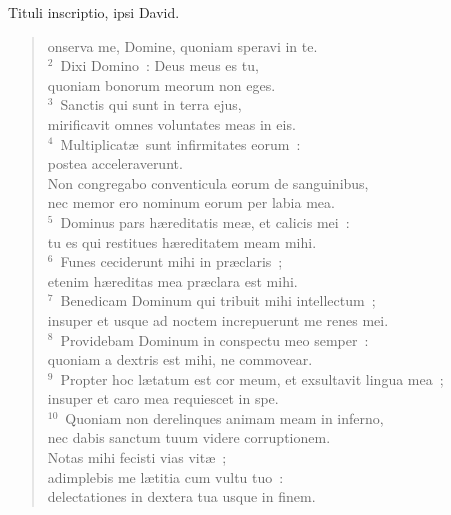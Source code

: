 \bchapter[Psalm]
Tituli inscriptio, ipsi David. \begin{verse}onserva me, Domine, quoniam speravi in te.\\
${}^{2}$~Dixi Domino~: Deus meus es tu,\\ quoniam bonorum meorum non eges.\\
${}^{3}$~Sanctis qui sunt in terra ejus,\\ mirificavit omnes voluntates meas in eis.\\
${}^{4}$~Multiplicat\ae\ sunt infirmitates eorum~:\\ postea acceleraverunt.\\ Non congregabo conventicula eorum de sanguinibus,\\ nec memor ero nominum eorum per labia mea.\\
${}^{5}$~Dominus pars h\ae reditatis me\ae , et calicis mei~:\\ tu es qui restitues h\ae reditatem meam mihi.\\
${}^{6}$~Funes ceciderunt mihi in pr\ae claris~;\\ etenim h\ae reditas mea pr\ae clara est mihi.\\
${}^{7}$~Benedicam Dominum qui tribuit mihi intellectum~;\\ insuper et usque ad noctem increpuerunt me renes mei.\\
${}^{8}$~Providebam Dominum in conspectu meo semper~:\\ quoniam a dextris est mihi, ne commovear.\\
${}^{9}$~Propter hoc l\ae tatum est cor meum, et exsultavit lingua mea~;\\ insuper et caro mea requiescet in spe.\\
${}^{10}$~Quoniam non derelinques animam meam in inferno,\\ nec dabis sanctum tuum videre corruptionem.\\ Notas mihi fecisti vias vit\ae~;\\ adimplebis me l\ae titia cum vultu tuo~:\\ delectationes in dextera tua usque in finem.\end{verse}



